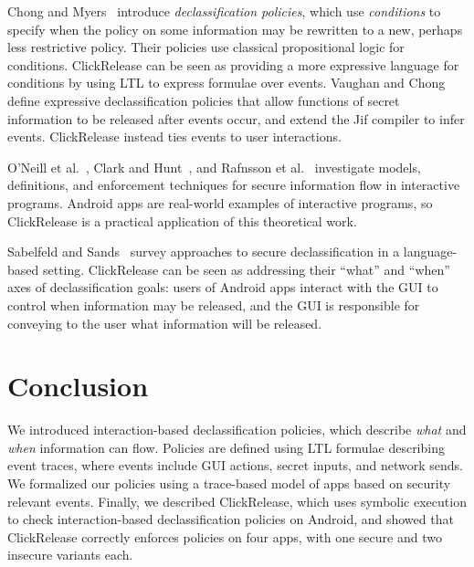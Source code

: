 \documentclass{llncs}
\newcommand{\toolname}{ClickRelease\xspace}
\begin{document}
Chong and Myers~\cite{Chong:04} introduce \emph{declassification policies},
which use \emph{conditions} to 
specify when the policy on some information may be rewritten to a new, perhaps
less restrictive policy.  Their policies use classical propositional logic for conditions.
\toolname can be seen as providing a more expressive language for
conditions by using LTL to express formulae over events.  
Vaughan and Chong~\cite{Vaughan:2011} define expressive declassification policies that
allow functions of secret information to be released after events occur, and
extend the Jif compiler to infer events.  \toolname instead 
ties events to user interactions.

O'Neill et al.~\cite{O'Neill:06}, Clark and Hunt~\cite{Clark:09}, and
Rafnsson et al.~\cite{Rafnsson:12} investigate models, definitions, and enforcement
techniques for secure information flow in interactive programs.
Android apps are real-world examples of interactive programs,
so \toolname is a practical application of this theoretical work.

Sabelfeld and Sands~\cite{Sabelfeld:2009} survey approaches to
secure declassification in a language-based setting.  \toolname
can be seen as addressing their ``what'' and ``when'' axes of
declassification goals:  users of Android apps interact with the GUI
to control when information may be released, and the GUI is responsible
for conveying to the user what information will be released.

\section{Conclusion}
\label{sec:conclusion}

We introduced interaction-based declassification policies, which describe
\emph{what} and \emph{when} information can flow. Policies are defined
using LTL formulae describing event traces, where events include GUI
actions, secret inputs, and network sends. We formalized our policies
using a trace-based model of apps based on security relevant events.
Finally, we described \toolname{}, which uses symbolic
execution to check interaction-based declassification policies on Android, and
showed that \toolname{} correctly enforces policies on four apps,
with one secure and two insecure variants each.





\end{document}
